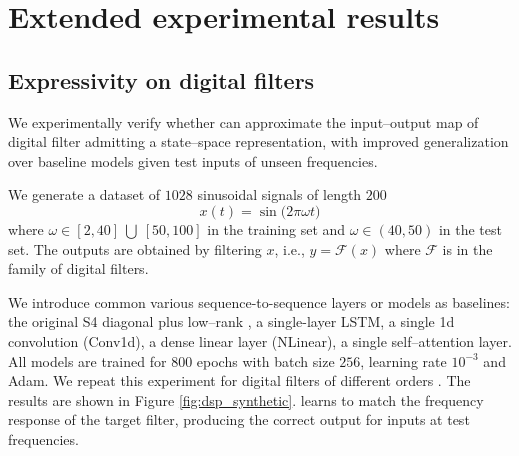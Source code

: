 \section{Extended experimental results} \label{app:exp_results}

\subsection{Expressivity on digital filters}


We experimentally verify whether \ourmethod{} can approximate the input--output map of digital filter admitting a state--space representation, with improved generalization over baseline models given test inputs of unseen frequencies.

We generate a dataset of $1028$ sinusoidal signals of length $200$
\[
x(t) = \sin{(2\pi \omega t})
\]
where $\omega \in [2, 40]~\bigcup~[50, 100]$ in the training set and $\omega \in (40, 50)$ in the test set. The outputs are obtained by filtering $x$, i.e., $y = \mathcal{F}(x)$  where $\mathcal{F}$ is in the family of digital filters. 

We introduce common various sequence-to-sequence layers or models as baselines: the original S4 diagonal plus low--rank \citep{gu2021efficiently}, a single-layer LSTM, a single 1d convolution (Conv1d), a dense linear layer (NLinear), a single self--attention layer. All models are trained for $800$ epochs with batch size $256$, learning rate $10^{-3}$ and Adam. We repeat this experiment for digital filters of different orders \citep{oppenheim1999discrete}. The results are shown in Figure \ref{fig:dsp_synthetic}. \ourmethod{} learns to match the frequency response of the target filter, producing the correct output for inputs at test frequencies. 


